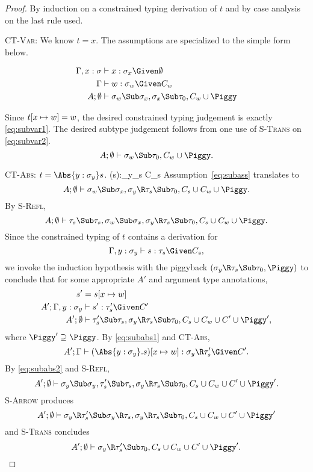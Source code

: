 \documentclass{amsart}
\theoremstyle{definition}
\begin{document}
\begin{proof}
By induction on a constrained typing derivation of $t$ and by
case analysis on the last rule used.

\Case\textsc{CT-Var}: We know $t=x$. The assumptions are
specialized to the simple form below.
\begin{samepage}
\begin{align}
\Gamma,x:\sigma&\vdash x:\sigma_x\Given\Exigent
\notag
\\
\Gamma&\vdash \Xdef:\sigma_\Xdef\Given C_\Xdef
\label{eq:subvar1}
\\
A;\Exigent&\vdash \sigma_\Xdef\Sub\sigma_x,\sigma_x\Sub\tau_0,C_\Xdef\cup\Piggy
\label{eq:subvar2}
\end{align}
\end{samepage}%
Since $t[x\mapsto w]=w$, the desired constrained typing judgement
is exactly \eqref{eq:subvar1}. The desired subtype judgement
follows from one use of \textsc{S-Trans} on \eqref{eq:subvar2}.
\[
A;\Exigent\vdash \sigma_\Xdef\Sub\tau_0,C_\Xdef\cup\Piggy.
\]

\Case\textsc{CT-Abs}: $t=\Abs{y:\sigma_y}s$.
\def\yasump{\Gamma,y:\sigma_y\vdash s:\tau_s\Given C_s}
\infrule[CT-Abs]
{\yasump}
{\Gamma\vdash(s):\sigma_y\R\tau_s \Given C_s}
Assumption~\eqref{eq:subass} translates to
\[
A;\Exigent\vdash
\sigma_\Xdef\Sub\sigma_x,
\sigma_y\R\tau_s\Sub\tau_0,C_s\cup C_\Xdef\cup\Piggy.
\]
By \textsc{S-Refl},
\[
A;\Exigent\vdash
    \tau_s\Sub\tau_s,
\sigma_\Xdef\Sub\sigma_x,
\sigma_y\R\tau_s\Sub\tau_0,C_s\cup C_\Xdef\cup\Piggy.
\]
Since the constrained typing of $t$ contains a derivation for
\[\yasump,\]
we invoke the induction hypothesis with the piggyback
$(\sigma_y\R\tau_s\Sub\tau_0,\Piggy)$ to conclude that for some
appropriate $A'$ and argument type annotations,
\begin{align}
s'&=s[x\mapsto \Xdef]\notag
\\
A';\Gamma,y:\sigma_y&\vdash s' : \tau_s'\Given C'
\label{eq:subabs1}
\\
A';\Exigent&\vdash
    \tau_s'\Sub\tau_s,
\sigma_y\R\tau_s\Sub\tau_0,C_s\cup C_\Xdef\cup C'\cup\Piggy',
\label{eq:subabs2}
\end{align}
where $\Piggy'\supseteq\Piggy$. By \eqref{eq:subabs1} and
\textsc{CT-Abs},
\[
A';\Gamma\vdash(\Abs{y:\sigma_y}.s)[x\mapsto \Xdef] : \sigma_y\R\tau_s'\Given C'.
\]
By \eqref{eq:subabs2} and \textsc{S-Refl},
\[
A';\Exigent\vdash
    \sigma_y\Sub\sigma_y,
    \tau_s'\Sub\tau_s,
\sigma_y\R\tau_s\Sub\tau_0,C_s\cup C_\Xdef\cup C'\cup\Piggy'.
\]
\textsc{S-Arrow} produces
\[
A';\Exigent\vdash
    \sigma_y\R\tau_s'\Sub\sigma_y\R\tau_s,
\sigma_y\R\tau_s\Sub\tau_0,C_s\cup C_\Xdef\cup C'\cup\Piggy'
\]
and \textsc{S-Trans} concludes
\[
A';\Exigent\vdash
    \sigma_y\R\tau_s'\Sub\tau_0,
C_s\cup C_\Xdef\cup C'\cup\Piggy'.
\]


\end{proof}
\end{document}
